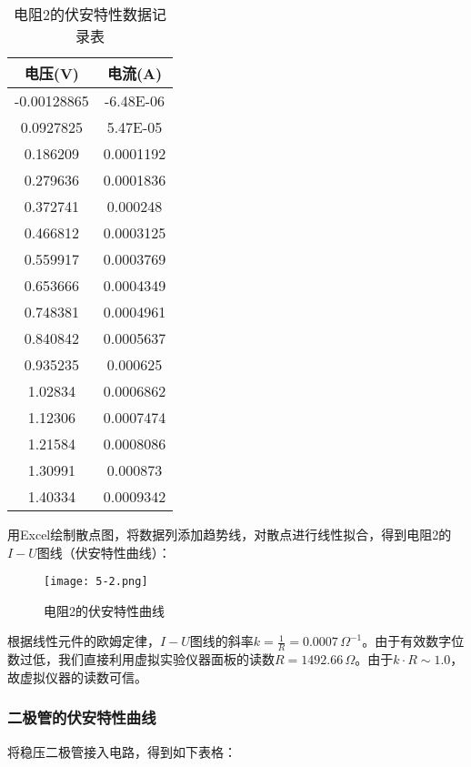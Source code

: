 \documentclass[12pt]{article}
\begin{document}
\begin{table}[htbp]
    \centering
    \begin{tabular}{|c|c|}
        \hline
        电压(V) & 电流(A) \\
        \hline
        -0.00128865 & -6.48E-06 \\
        \hline
        0.0927825 & 5.47E-05 \\
        \hline
        0.186209 & 0.0001192 \\
        \hline
        0.279636 & 0.0001836 \\
        \hline
        0.372741 & 0.000248 \\
        \hline
        0.466812 & 0.0003125 \\
        \hline
        0.559917 & 0.0003769 \\
        \hline
        0.653666 & 0.0004349 \\
        \hline
        0.748381 & 0.0004961 \\
        \hline
        0.840842 & 0.0005637 \\
        \hline
        0.935235 & 0.000625 \\
        \hline
        1.02834 & 0.0006862 \\
        \hline
        1.12306 & 0.0007474 \\
        \hline
        1.21584 & 0.0008086 \\
        \hline
        1.30991 & 0.000873 \\
        \hline
        1.40334 & 0.0009342 \\
        \hline
    \end{tabular}%
    \caption{电阻2的伏安特性数据记录表}
  \end{table}%

用Excel绘制散点图，将数据列添加趋势线，对散点进行线性拟合，得到电阻2的$I-U$图线（伏安特性曲线）：

\begin{figure}[h!]
    \centering
    \texttt{[image: 5-2.png]}
    \caption{电阻2的伏安特性曲线}
\end{figure}

根据线性元件的欧姆定律，$I-U$图线的斜率$k=\frac{1}{R}=0.0007\,\Omega^{-1}$。由于有效数字位数过低，我们直接利用虚拟实验仪器面板的读数$R=1492.66\,\Omega$。由于$k\cdot R\sim 1.0$，故虚拟仪器的读数可信。

\subsubsection{二极管的伏安特性曲线}
将稳压二极管接入电路，得到如下表格：
\end{document}
